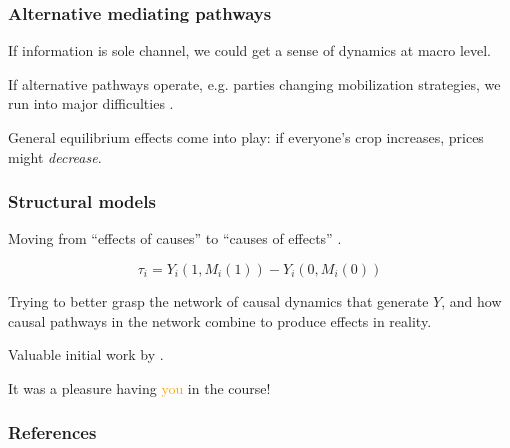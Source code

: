 \documentclass[12pt,english,dvipsnames,aspectratio=169,handout]{beamer}\usepackage[]{graphicx}\usepackage[]{xcolor}
\begin{document}
\begin{frame}
	\frametitle{Alternative mediating pathways}
	If information is sole channel, we could get a sense of dynamics at macro level.\bigskip
	\pause
	
	If alternative pathways operate, e.g. parties changing mobilization strategies, we run into major difficulties \cite{humphreys_aggregation_2020}.\bigskip
	\pause
	
	General equilibrium effects come into play: if everyone's crop increases, prices might \textit{decrease}.\bigskip
	
\end{frame}


\begin{frame}
	\frametitle{Structural models}
	Moving from ``effects of causes'' to ``causes of effects'' \cite{holland_statistics_1986}.
	\pause
	
	\begin{equation}
		\tau_i = Y_i(1, M_i(1)) - Y_i(0, M_i(0))
	\end{equation}\pause

	Trying to better grasp the network of causal dynamics that generate $Y$, and how causal pathways in the network combine to produce effects in reality.\bigskip
	
	Valuable initial work by .
	
\end{frame}

\begin{frame}
	\begin{center}
		\Huge It was a pleasure having \textcolor{orange}{you} in the course!
	\end{center}
\end{frame}



\begin{frame}
\frametitle{References}

\scriptsize
\end{frame}
\end{document}
